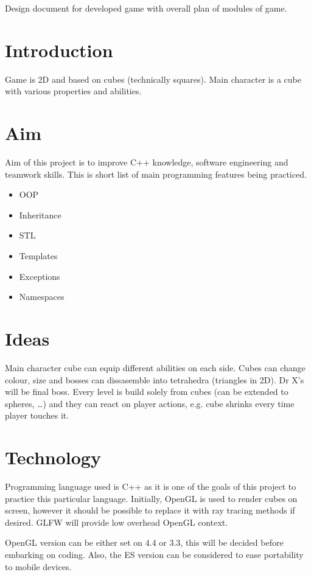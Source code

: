 \documentclass{article}
\begin{document}
Design document for developed game with overall plan of modules of game.

\section{Introduction}
Game is 2D and based on cubes (technically squares). Main character is a cube with
various properties and abilities.

\section{Aim}
Aim of this project is to improve C++ knowledge, software engineering and teamwork skills.
This is short list of main programming features being practiced.

\begin{itemize}
    \item{OOP}
    \item{Inheritance}
    \item{STL}
    \item{Templates}
    \item{Exceptions}
    \item{Namespaces}
\end{itemize}

\section{Ideas}
Main character cube can equip different abilities on each side. Cubes can change colour,
size and bosses can dissasemble into tetrahedra (triangles in 2D). Dr X's will
be final boss. Every level is build solely from cubes (can be extended to spheres, \dots)
and they can react on player actions, e.g. cube shrinks every time player touches it.

\section{Technology}
Programming language used is C++ as it is one of the goals of this project to practice
this particular language. Initially, OpenGL is used to render cubes on screen, however
it should be possible to replace it with ray tracing methods if desired.
GLFW will provide low overhead OpenGL context.

OpenGL version can be either set on 4.4 or 3.3, this will be decided before embarking
on coding. Also, the ES version can be considered to ease portability to mobile devices.
\end{document}

